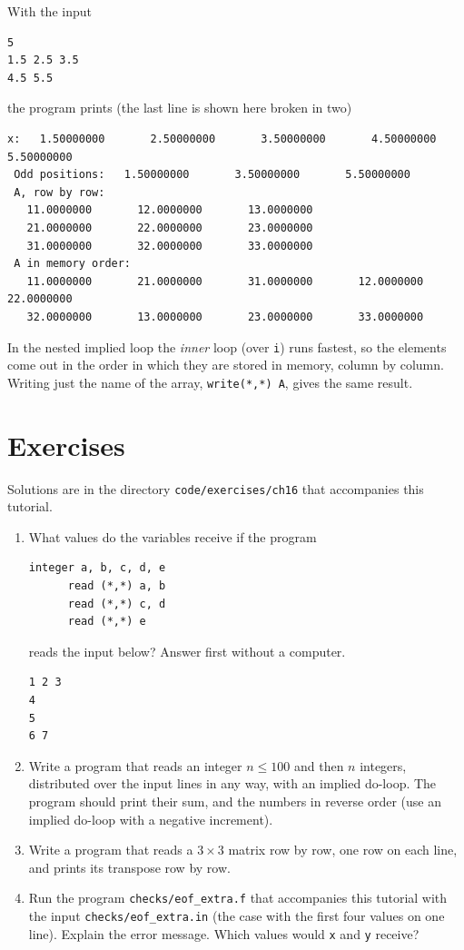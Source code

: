 With the input

\begin{lstlisting}[style=fortran77]
5
1.5 2.5 3.5
4.5 5.5
\end{lstlisting}

the program prints (the last line is shown here broken in two)

\begin{lstlisting}[style=output]
 x:   1.50000000       2.50000000       3.50000000       4.50000000       5.50000000
 Odd positions:   1.50000000       3.50000000       5.50000000
 A, row by row:
   11.0000000       12.0000000       13.0000000
   21.0000000       22.0000000       23.0000000
   31.0000000       32.0000000       33.0000000
 A in memory order:
   11.0000000       21.0000000       31.0000000       12.0000000       22.0000000
   32.0000000       13.0000000       23.0000000       33.0000000
\end{lstlisting}

In the nested implied loop the \emph{inner} loop (over \texttt{i}) runs fastest, so the elements come out in the order in which they are stored in memory, column by column. Writing just the name of the array, \texttt{write(*,*) A}, gives the same result.

\section{Exercises}

Solutions are in the directory \texttt{code/exercises/ch16} that accompanies this tutorial.

\begin{enumerate}
    \item What values do the variables receive if the program

\begin{lstlisting}[style=fortran77]
      integer a, b, c, d, e
      read (*,*) a, b
      read (*,*) c, d
      read (*,*) e
\end{lstlisting}

    reads the input below? Answer first without a computer.

\begin{lstlisting}[style=fortran77]
1 2 3
4
5
6 7
\end{lstlisting}

    \item Write a program that reads an integer $n \le 100$ and then $n$ integers, distributed over the input lines in any way, with an implied do-loop. The program should print their sum, and the numbers in reverse order (use an implied do-loop with a negative increment).
    \item Write a program that reads a $3 \times 3$ matrix row by row, one row on each line, and prints its transpose row by row.
    \item Run the program \texttt{checks/eof\_extra.f} that accompanies this tutorial with the input \texttt{checks/eof\_extra.in} (the case with the first four values on one line). Explain the error message. Which values would \texttt{x} and \texttt{y} receive?
\end{enumerate}
